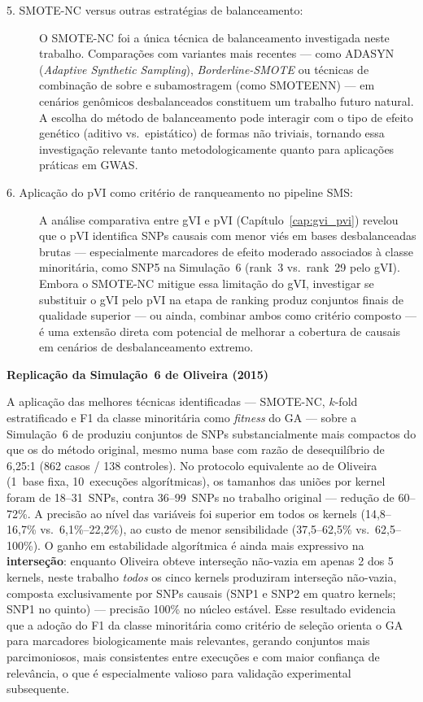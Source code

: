 \documentclass[
    12pt,
    a4paper,
    oneside,
    english,
    french,
    spanish,
    brazil
    ]{abntex2}
\newcommand{\novo}[1]{\textcolor{corNova}{#1}}
\begin{document}
\begin{description}
  \item[\novo{5. SMOTE-NC versus outras estratégias de balanceamento:}]
  \novo{O SMOTE-NC foi a única técnica de balanceamento investigada neste trabalho. Comparações com variantes mais recentes --- como ADASYN (\textit{Adaptive Synthetic Sampling}), \textit{Borderline-SMOTE} ou técnicas de combinação de sobre e subamostragem (como SMOTEENN) --- em cenários genômicos desbalanceados constituem um trabalho futuro natural. A escolha do método de balanceamento pode interagir com o tipo de efeito genético (aditivo vs.\ epistático) de formas não triviais, tornando essa investigação relevante tanto metodologicamente quanto para aplicações práticas em GWAS.}

  \item[\novo{6. Aplicação do pVI como critério de ranqueamento no pipeline SMS:}]
  \novo{A análise comparativa entre gVI e pVI (Capítulo~\ref{cap:gvi_pvi}) revelou que o pVI identifica SNPs causais com menor viés em bases desbalanceadas brutas --- especialmente marcadores de efeito moderado associados à classe minoritária, como SNP5 na Simulação~6 (rank~3 vs.\ rank~29 pelo gVI). Embora o SMOTE-NC mitigue essa limitação do gVI, investigar se substituir o gVI pelo pVI na etapa de ranking produz conjuntos finais de qualidade superior --- ou ainda, combinar ambos como critério composto --- é uma extensão direta com potencial de melhorar a cobertura de causais em cenários de desbalanceamento extremo.}

\end{description}

\bigskip
\bigskip
\noindent\textbf{Replicação da Simulação~6 de Oliveira (2015)}

\novo{A aplicação das melhores técnicas identificadas --- SMOTE-NC, $k$-fold estratificado e F1 da classe minoritária como \textit{fitness} do GA --- sobre a Simulação~6 de \citeonline{Oliveira2015} produziu conjuntos de SNPs substancialmente mais compactos do que os do método original, mesmo numa base com razão de desequilíbrio de 6,25:1 (862 casos / 138 controles). No protocolo equivalente ao de Oliveira (1~base fixa, 10~execuções algorítmicas), os tamanhos das uniões por kernel foram de 18--31~SNPs, contra 36--99~SNPs no trabalho original --- redução de 60--72\%. A precisão ao nível das variáveis foi superior em todos os kernels (14,8--16,7\% vs.\ 6,1\%--22,2\%), ao custo de menor sensibilidade (37,5--62,5\% vs.\ 62,5--100\%). O ganho em estabilidade algorítmica é ainda mais expressivo na \textbf{interseção}: enquanto Oliveira obteve interseção não-vazia em apenas 2 dos 5 kernels, neste trabalho \emph{todos} os cinco kernels produziram interseção não-vazia, composta exclusivamente por SNPs causais (SNP1 e SNP2 em quatro kernels; SNP1 no quinto) --- precisão 100\% no núcleo estável. Esse resultado evidencia que a adoção do F1 da classe minoritária como critério de seleção orienta o GA para marcadores biologicamente mais relevantes, gerando conjuntos mais parcimoniosos, mais consistentes entre execuções e com maior confiança de relevância, o que é especialmente valioso para validação experimental subsequente.}
\end{document}
